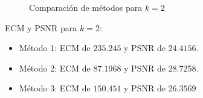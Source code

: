 \begin{figure}[H]
    \centering
    \qquad
    \qquad
    \caption{Comparación de métodos para $k = 2$}%
    \label{fig:example}%
\end{figure}

ECM y PSNR para $k = 2$:

\begin{itemize}
 \item Método 1: ECM de $235.245$ y PSNR de $24.4156$.
 \item Método 2: ECM de $87.1968$ y PSNR de $28.7258$.
 \item Método 3: ECM de $150.451$ y PSNR de $26.3569$
\end{itemize}

